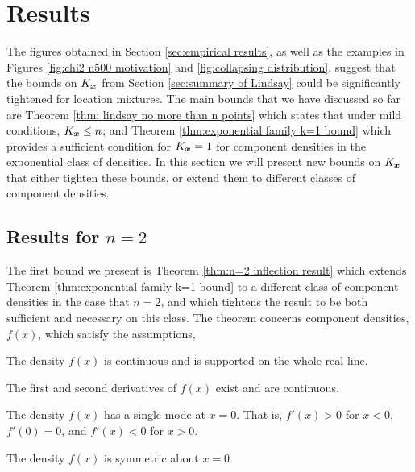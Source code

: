 	\section{Results}
		\label{sec:mixture results}
		The figures obtained in Section \ref{sec:empirical results}, as well as the examples in Figures \ref{fig:chi2 n500 motivation} and \ref{fig:collapsing distribution}, suggest that the bounds on $K_{\bm{{x}}}$ from Section \ref{sec:summary of Lindsay} could be significantly tightened for location mixtures. The main bounds that we have discussed so far are Theorem \ref{thm: lindsay no more than n points} which states that under mild conditions, $K_{\bm{{x}}} \leq n$; and Theorem \ref{thm:exponential family k=1 bound} which provides a sufficient condition for $K_{\bm{{x}}} = 1$ for component densities in the exponential class of densities. In this section we will present new bounds on $K_{\bm{{x}}}$ that either tighten these bounds, or extend them to different classes of component densities.

		\subsection{Results for \texorpdfstring{$n = 2$}{n = 2}}
		\label{sec:results for n = 2}
		The first bound we present is Theorem \ref{thm:n=2 inflection result} which extends Theorem \ref{thm:exponential family k=1 bound} to a different class of component densities in the case that $n=2$, and which tightens the result to be both sufficient and necessary on this class. The theorem concerns component densities, $f(x)$, which satisfy the assumptions,

		\begin{assumption}[Continuity]
		\label{assump:reallinesupport}
			The density $f(x)$ is continuous and is supported on the whole real line.
		\end{assumption}

		\begin{assumption}[Differentiability]
		\label{assump:twicediff}
			The first and second derivatives of $f(x)$ exist and are continuous.
		\end{assumption}
		
		\begin{assumption}[Unimodality]
			The density $f(x)$ has a single mode at $x=0$. That is, $f'(x) > 0$ for $x <0$, $f'(0) = 0$, and $f'(x) < 0$ for $x>0$.
			\label{assump:singlemode}
		\end{assumption}
		
		\begin{assumption}[Symmetry]
			The density $f(x)$ is symmetric about $x = 0$.
			\label{assump:symmetric}
		\end{assumption}
		
